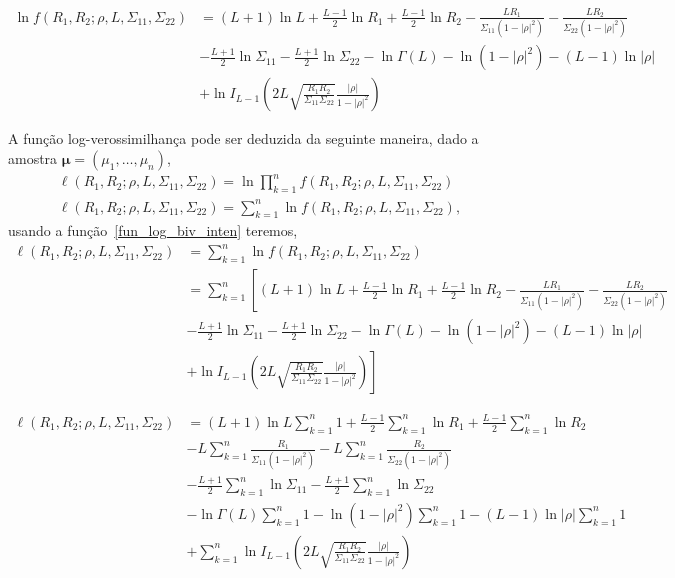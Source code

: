 \begin{equation}\label{fun_log_biv_inten}
\begin{split}
	\ln f(R_1,R_2;\rho,L, \Sigma_{11}, \Sigma_{22})&=(L+1)\ln L +\frac{L-1}{2} \ln R_1 +\frac{L-1}{2} \ln R_2 -\frac{LR_1}{\Sigma_{11}(1-|\rho|^2)}-\frac{LR_2}{\Sigma_{22}(1-|\rho|^2)}\\
	&-\frac{L+1}{2}\ln\Sigma_{11}-\frac{L+1}{2}\ln\Sigma_{22} - \ln\Gamma(L)- \ln(1-|\rho|^2)-(L-1)\ln|\rho|\\
	&+\ln I_{L-1}\left(2L\sqrt{\frac{R_1R_2}{\Sigma_{11}\Sigma_{22}}}\frac{|\rho|}{1-|\rho|^2}\right)
\end{split}
\end{equation}


A função log-verossimilhança pode ser deduzida da seguinte maneira, dado a amostra $\bm\mu = (\mu_1,\dots,\mu_n)$, 
\begin{equation}\nonumber
\begin{split}
  \ell(R_1, R_2;\rho, L, \Sigma_{11}, \Sigma_{22})=\ln\prod_{k=1}^{n}f(R_1, R_2;\rho,L, \Sigma_{11}, \Sigma_{22})\\
  \ell(R_1, R_2;\rho, L, \Sigma_{11}, \Sigma_{22})=\sum_{k=1}^{n}\ln f(R_1, R_2;\rho,L, \Sigma_{11}, \Sigma_{22}),
 \end{split}
 \end{equation}
usando a função~\eqref{fun_log_biv_inten} teremos,
\begin{equation}\nonumber
\begin{split}
    \ell(R_1, R_2;\rho, L, \Sigma_{11}, \Sigma_{22})&=\sum_{k=1}^{n}\ln f(R_1, R_2;\rho, L, \Sigma_{11}, \Sigma_{22})\\
                         &=\sum_{k=1}^{n}\left[(L+1)\ln L +\frac{L-1}{2} \ln R_1 +\frac{L-1}{2} \ln R_2 -\frac{LR_1}{\Sigma_{11}(1-|\rho|^2)}-\frac{LR_2}{\Sigma_{22}(1-|\rho|^2)}\right.\\
	&-\frac{L+1}{2}\ln\Sigma_{11}-\frac{L+1}{2}\ln\Sigma_{22} - \ln\Gamma(L)- \ln(1-|\rho|^2)-(L-1)\ln|\rho|\\
	&\left.+\ln I_{L-1}\left(2L\sqrt{\frac{R_1R_2}{\Sigma_{11}\Sigma_{22}}}\frac{|\rho|}{1-|\rho|^2}\right)\right]
 \end{split}
 \end{equation}
 
 \begin{equation}\nonumber
\begin{split} 
  \ell(R_1, R_2;\rho, L, \Sigma_{11}, \Sigma_{22})&=(L+1)\ln L\sum_{k=1}^{n}1 +\frac{L-1}{2}\sum_{k=1}^{n} \ln R_1 +\frac{L-1}{2} \sum_{k=1}^{n}\ln R_2\\
                        &-L\sum_{k=1}^{n}\frac{R_1}{\Sigma_{11}(1-|\rho|^2)}-L\sum_{k=1}^{n}\frac{R_2}{\Sigma_{22}(1-|\rho|^2)}\\
	&-\frac{L+1}{2}\sum_{k=1}^{n}\ln\Sigma_{11}-\frac{L+1}{2}\sum_{k=1}^{n}\ln\Sigma_{22} \\
	&- \ln\Gamma(L)\sum_{k=1}^{n}1- \ln(1-|\rho|^2)\sum_{k=1}^{n}1-(L-1)\ln|\rho|\sum_{k=1}^{n}1\\
	&+\sum_{k=1}^{n}\ln I_{L-1}\left(2L\sqrt{\frac{R_1R_2}{\Sigma_{11}\Sigma_{22}}}\frac{|\rho|}{1-|\rho|^2}\right)
\end{split}
\end{equation}

